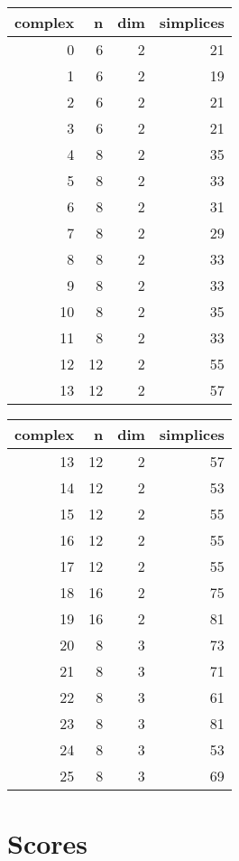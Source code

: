 \documentclass{article}
\begin{document}
\begin{tabular}{rrrr}
\toprule
complex & n & dim & simplices \\
\midrule
0 & 6 & 2 & 21 \\
1 & 6 & 2 & 19 \\
2 & 6 & 2 & 21 \\
3 & 6 & 2 & 21 \\
4 & 8 & 2 & 35 \\
5 & 8 & 2 & 33 \\
6 & 8 & 2 & 31 \\
7 & 8 & 2 & 29 \\
8 & 8 & 2 & 33 \\
9 & 8 & 2 & 33 \\
10 & 8 & 2 & 35 \\
11 & 8 & 2 & 33 \\
12 & 12 & 2 & 55 \\
13 & 12 & 2 & 57 \\
\bottomrule
\end{tabular}
\begin{tabular}{rrrr}
\toprule
complex & n & dim & simplices \\
\midrule
13 & 12 & 2 & 57 \\
14 & 12 & 2 & 53 \\
15 & 12 & 2 & 55 \\
16 & 12 & 2 & 55 \\
17 & 12 & 2 & 55 \\
18 & 16 & 2 & 75 \\
19 & 16 & 2 & 81 \\
20 & 8 & 3 & 73 \\
21 & 8 & 3 & 71 \\
22 & 8 & 3 & 61 \\
23 & 8 & 3 & 81 \\
24 & 8 & 3 & 53 \\
25 & 8 & 3 & 69 \\
\bottomrule
\end{tabular}



\section{Scores}
\end{document}
